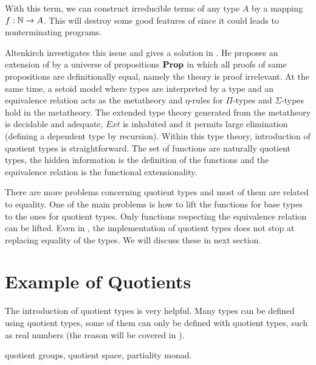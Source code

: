 
With this term, we can construct irreducible terms of any type $A$ by a
mapping $f : \mathbb{N} \rightarrow A$. This will destroy some good features of \itt
since it could leads to nonterminating programs.

Altenkirch investigates this issue and gives a solution in
\cite{alti:lics99}. He proposes an extension of \itt by a universe of
propositions $\operatorname{\mathbf{Prop}}$ in which all proofs of same propositions are
definitionally equal, namely the theory is proof irrelevant. At the same time,
a setoid model where types are interpreted by a type and an equivalence relation acts as the metatheory and $\eta$-rules for
$\Pi$-types and $\Sigma$-types hold in the metatheory. The extended type
theory generated from the metatheory is decidable and adequate, $Ext$ is
inhabited and it permits large elimination (defining a dependent type by recursion). Within this type theory,
introduction of quotient types is straightforward. 
The set of functions are naturally quotient types, the hidden information is the
definition of the functions and the equivalence relation is the
functional extensionality.

There are more problems concerning quotient types and most
of them are related to equality. One of the main problems is how to lift the functions for
base types to the ones for quotient types. Only functions respecting the
equivalence relation can be lifted. Even in \ett, the implementation
of quotient types does not stop at replacing equality of the types. We
will discuss these in next section.


\section{Example of Quotients}

The introduction of quotient types is very helpful. Many types can be
defined using quotient types, some of them can only be defined with quotient types, such as real
numbers (the reason will be covered in \todo).




quotient groups, quotient space, partiality monad.